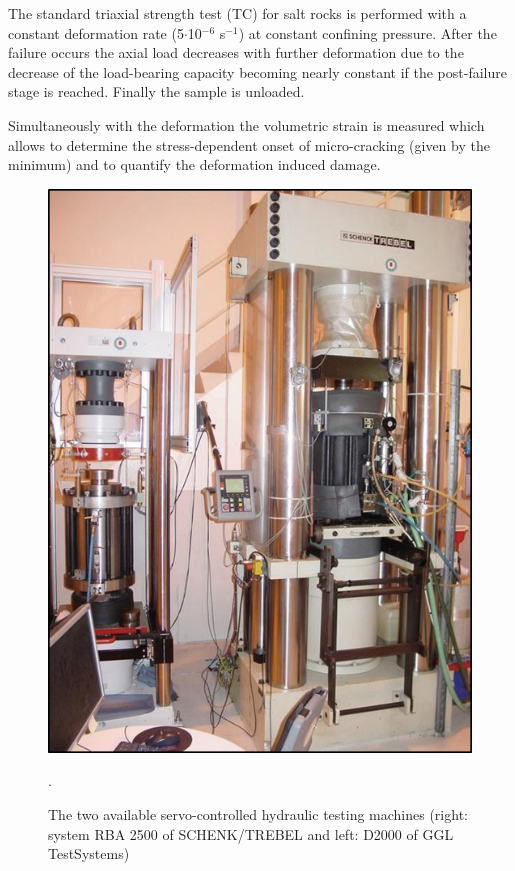 The standard triaxial strength test (TC) for salt rocks is performed with a constant deformation rate 
(5$\cdot$10$^{-6}$ s$^{-1}$) at constant confining pressure. After the failure occurs the axial load decreases with further deformation due to the decrease of the load-bearing capacity becoming nearly constant if the post-failure stage is reached. Finally the sample is unloaded.

Simultaneously with the deformation the volumetric strain is measured which allows to determine the 
stress-dependent onset of micro-cracking (given by the minimum) and to quantify the deformation induced damage.

\begin{figure}[!ht]
\centering
\includegraphics[width=1\textwidth]{./figures/ifg-lab-photo3.png}
\caption{The two available servo-controlled hydraulic testing machines (right: system RBA 2500 of SCHENK/TREBEL and left: D2000 of GGL TestSystems)}.
\label{fig:ifglabph2}
\end{figure}
